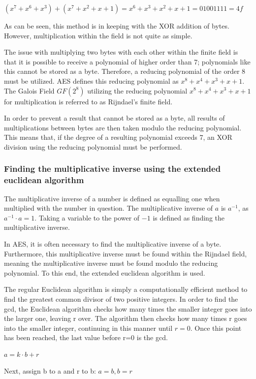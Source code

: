 \documentclass[12pt]{report}
\theoremstyle{definition}
\theoremstyle{remark}
\begin{document}
$(x^7+x^6+x^3)+(x^7+x^2+x+1) = x^6+x^3+x^2+x+1 = 01001111 = 4f$

As can be seen, this method is in keeping with the XOR addition of bytes. However, multiplication within the field is not quite as simple.

The issue with multiplying two bytes with each other within the finite field is that it is possible to receive a polynomial of higher order than 7; polynomials like this cannot be stored as a byte. Therefore, a reducing polynomial of the order 8 must be utilized. AES defines this reducing polynomial as $x^8+x^4+x^3+x+1$. The Galois Field $GF(2^8)$ utilizing the reducing polynomial $x^8+x^4+x^3+x+1$ for multiplication is referred to as Rijndael's finite field\cite{RFiniteField}.

In order to prevent a result that cannot be stored as a byte, all results of multiplications between bytes are then taken modulo the reducing polynomial. This means that, if the degree of a resulting polynomial exceeds 7, an XOR division using the reducing polynomial must be performed.

\subsubsection{Finding the multiplicative inverse using the extended euclidean algorithm}
The multiplicative inverse of a number is defined as equalling one when multiplied with the number in question. The multiplicative inverse of $a$ is $a^{-1}$, as $a^{-1} \cdot a = 1$. Taking a variable to the power of $-1$ is defined as finding the multiplicative inverse.

In AES, it is often necessary to find the multiplicative inverse of a byte. Furthermore, this multiplicative inverse must be found within the Rijndael field, meaning the multiplicative inverse must be found modulo the reducing polynomial. To this end, the extended euclidean algorithm is used.

The regular Euclidean algorithm is simply a computationally efficient method to find the greatest common divisor of two positive integers. In order to find the gcd, the Euclidean algorithm checks how many times the smaller integer goes into the larger one, leaving r over. The algorithm then checks how many times r goes into the smaller integer, continuing in this manner until $r=0$. Once this point has been reached, the last value before r=0 is the gcd.

$a = k \cdot b + r$

Next, assign b to a and r to b: $a=b, b=r$
 
\end{document}
